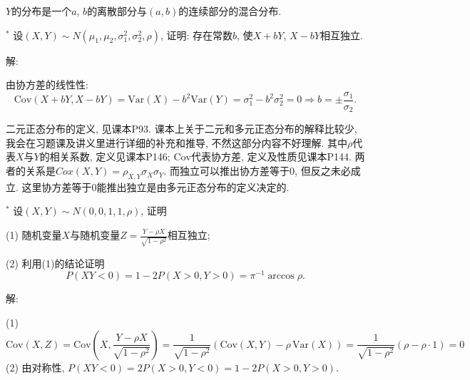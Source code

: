 \documentclass[standard]{ExBook}
\begin{document}
\begin{qitems}
\begin{bbox}
 $Y$的分布是一个$a$, $b$的离散部分与$(a,b)$的连续部分的混合分布.
    \end{bbox}

\vspace{-5em}

    \begin{bbox}
    \begin{shaded}
        \qitem$^*$
设$(X,Y)\sim N(\mu_{1},\mu_{2},\sigma_{1}^{2},\sigma_{2}^{2},\rho)$, 证明: 存在常数$b$, 使$X+bY$, $X-bY$相互独立.
    \end{shaded}
    \end{bbox}

\vspace{-5em}

    \begin{bbox}
解: 

由协方差的线性性:
$$\mathrm{Cov}(X+bY,X-bY)=\mathrm{Var}(X)-b^2 \mathrm{Var}(Y)=\sigma_{1}^2-b^2 \sigma_{2}^2=0 \Longrightarrow b=\pm\frac{\sigma_1}{\sigma_2}.$$

\textcolor{themeColor}{\selectfont {} 二元正态分布的定义, 见课本P93. 课本上关于二元和多元正态分布的解释比较少, 我会在习题课及讲义里进行详细的补充和推导, 不然这部分内容不好理解. 其中$\rho$代表$X$与$Y$的相关系数, 定义见课本P146; $\mathrm{Cov}$代表协方差, 定义及性质见课本P144. 两者的关系是$Cox(X,Y)=\rho_{X,Y}\sigma_{X}\sigma_{Y}$. 而独立可以推出协方差等于0, 但反之未必成立. 这里协方差等于0能推出独立是由多元正态分布的定义决定的.}
    \end{bbox}

\vspace{-5em}

    \begin{bbox}
    \begin{shaded}
        \qitem$^*$
设$(X,Y)\sim N(0,0,1,1,\rho)$, 证明

\vspace{0.5em}
(1) 随机变量$X$与随机变量$Z=\displaystyle\frac{Y-\rho X}{\sqrt{1-\rho^2}}$相互独立;

(2) 利用(1)的结论证明
$$P(XY<0)=1-2P(X>0,Y>0)=\pi^{-1}\arccos \rho.$$
    \end{shaded}
    \end{bbox}

\vspace{-5em}

    \begin{bbox}
解: 

(1)
\[
\mathrm{Cov}(X, Z) = \mathrm{Cov}\left(X, \frac{Y - \rho X}{\sqrt{1 - \rho^2}}\right) = \frac{1}{\sqrt{1 - \rho^2}} \left( \mathrm{Cov}(X, Y) - \rho \, \mathrm{Var}(X) \right) = \frac{1}{\sqrt{1 - \rho^2}} \left( \rho - \rho \cdot 1 \right) = 0
\]
(2) 由对称性, $P(XY<0)=2P(X>0,Y<0)=1-2P(X>0,Y>0)$.


\end{bbox}
\end{qitems}
\end{document}
